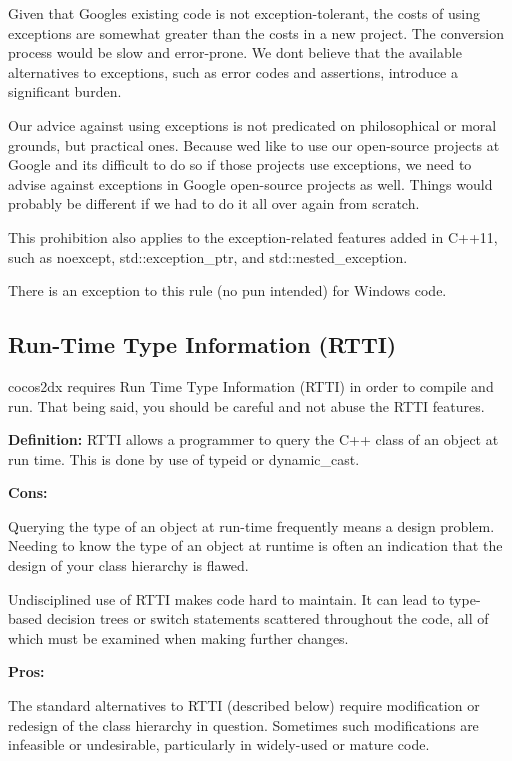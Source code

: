Given that Google\textquotesingle{}s existing code is not exception-\/tolerant, the costs of using exceptions are somewhat greater than the costs in a new project. The conversion process would be slow and error-\/prone. We don\textquotesingle{}t believe that the available alternatives to exceptions, such as error codes and assertions, introduce a significant burden.

Our advice against using exceptions is not predicated on philosophical or moral grounds, but practical ones. Because we\textquotesingle{}d like to use our open-\/source projects at Google and it\textquotesingle{}s difficult to do so if those projects use exceptions, we need to advise against exceptions in Google open-\/source projects as well. Things would probably be different if we had to do it all over again from scratch.

This prohibition also applies to the exception-\/related features added in C++11, such as noexcept, {\ttfamily std\+::exception\+\_\+ptr}, and {\ttfamily std\+::nested\+\_\+exception}.

There is an exception to this rule (no pun intended) for Windows code.

\subsection*{Run-\/\+Time Type Information (R\+T\+TI)}

cocos2dx requires Run Time Type Information (R\+T\+TI) in order to compile and run. That being said, you should be careful and not abuse the R\+T\+TI features.

{\bfseries Definition\+:} R\+T\+TI allows a programmer to query the C++ class of an object at run time. This is done by use of typeid or dynamic\+\_\+cast.

{\bfseries Cons\+:}

Querying the type of an object at run-\/time frequently means a design problem. Needing to know the type of an object at runtime is often an indication that the design of your class hierarchy is flawed.

Undisciplined use of R\+T\+TI makes code hard to maintain. It can lead to type-\/based decision trees or switch statements scattered throughout the code, all of which must be examined when making further changes.

{\bfseries Pros\+:}

The standard alternatives to R\+T\+TI (described below) require modification or redesign of the class hierarchy in question. Sometimes such modifications are infeasible or undesirable, particularly in widely-\/used or mature code.

